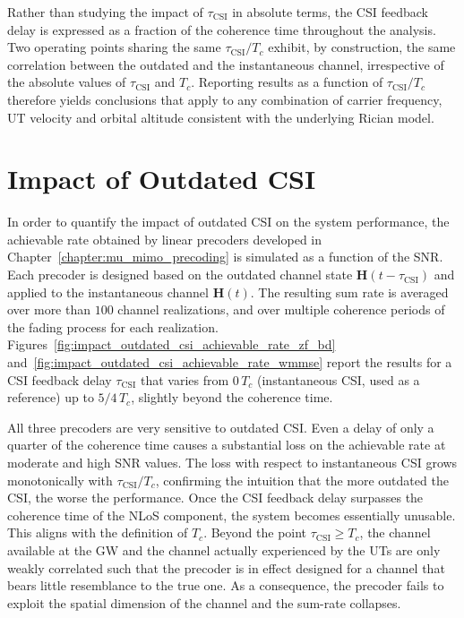 Rather than studying the impact of $\tau_{\mathrm{CSI}}$ in absolute terms, the \ac{CSI} feedback delay is expressed as a fraction of the coherence time throughout the analysis.
Two operating points sharing the same $\tau_{\mathrm{CSI}} / T_c$ exhibit, by construction, the same correlation between the outdated and the instantaneous channel, irrespective of the absolute values of $\tau_{\mathrm{CSI}}$ and $T_c$. 
Reporting results as a function of $\tau_{\mathrm{CSI}} / T_c$ therefore yields conclusions that apply to any combination of carrier frequency, \ac{UT} velocity and orbital altitude consistent with the underlying Rician model.

\section{Impact of Outdated CSI}
\label{section:outdated_csi_impact}

In order to quantify the impact of outdated \ac{CSI} on the system performance, the achievable rate obtained by linear precoders developed in Chapter~\ref{chapter:mu_mimo_precoding} is simulated as a function of the \ac{SNR}.
Each precoder is designed based on the outdated channel state $\mathbf{H}(t - \tau_{\mathrm{CSI}})$ and applied to the instantaneous channel $\mathbf{H}(t)$. The resulting sum rate is averaged over more than $100$ channel realizations, and over multiple coherence periods of the fading process for each realization.
Figures~\ref{fig:impact_outdated_csi_achievable_rate_zf_bd} and~\ref{fig:impact_outdated_csi_achievable_rate_wmmse} report the results for a \ac{CSI} feedback delay $\tau_{\mathrm{CSI}}$ that varies from $0 \, T_c$ (instantaneous \ac{CSI}, used as a reference) up to $5/4\, T_c$, slightly beyond the coherence time.

All three precoders are very sensitive to outdated \ac{CSI}. Even a delay of only a quarter of the coherence time causes a substantial loss on the achievable rate at moderate and high \ac{SNR} values. 
The loss with respect to instantaneous \ac{CSI} grows monotonically with $\tau_{\mathrm{CSI}}/T_c$, confirming the intuition that the more outdated the \ac{CSI}, the worse the performance.
Once the \ac{CSI} feedback delay surpasses the coherence time of the \ac{NLoS} component, the system becomes essentially unusable.
This aligns with the definition of $T_c$.
Beyond the point $\tau_{\mathrm{CSI}} \geq T_c$, the channel available at the \ac{GW} and the channel actually experienced by the \acp{UT} are only weakly correlated such that the precoder is in effect designed for a channel that bears little resemblance to the true one.
As a consequence, the precoder fails to exploit the spatial dimension of the channel and the sum-rate collapses.

